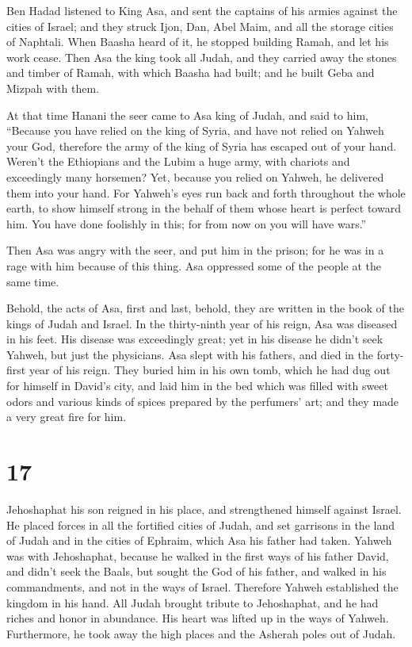  Ben Hadad listened to King Asa, and sent the captains of
his armies against the cities of Israel; and they struck Ijon, Dan, Abel
Maim, and all the storage cities of Naphtali.  When Baasha
heard of it, he stopped building Ramah, and let his work cease.
 Then Asa the king took all Judah, and they carried away
the stones and timber of Ramah, with which Baasha had built; and he
built Geba and Mizpah with them.

 At that time Hanani the seer came to Asa king of Judah,
and said to him, ``Because you have relied on the king of Syria, and
have not relied on Yahweh your God, therefore the army of the king of
Syria has escaped out of your hand.  Weren't the
Ethiopians and the Lubim a huge army, with chariots and exceedingly many
horsemen? Yet, because you relied on Yahweh, he delivered them into your
hand.  For Yahweh's eyes run back and forth throughout the
whole earth, to show himself strong in the behalf of them whose heart is
perfect toward him. You have done foolishly in this; for from now on you
will have wars.''

 Then Asa was angry with the seer, and put him in the
prison; for he was in a rage with him because of this thing. Asa
oppressed some of the people at the same time.

 Behold, the acts of Asa, first and last, behold, they
are written in the book of the kings of Judah and Israel.
 In the thirty-ninth year of his reign, Asa was diseased
in his feet. His disease was exceedingly great; yet in his disease he
didn't seek Yahweh, but just the physicians.  Asa slept
with his fathers, and died in the forty-first year of his reign.
 They buried him in his own tomb, which he had dug out
for himself in David's city, and laid him in the bed which was filled
with sweet odors and various kinds of spices prepared by the perfumers'
art; and they made a very great fire for him.

\hypertarget{section-16}{%
\section{17}\label{section-16}}

 Jehoshaphat his son reigned in his place, and
strengthened himself against Israel.  He placed forces in
all the fortified cities of Judah, and set garrisons in the land of
Judah and in the cities of Ephraim, which Asa his father had taken.
 Yahweh was with Jehoshaphat, because he walked in the
first ways of his father David, and didn't seek the Baals,
 but sought the God of his father, and walked in his
commandments, and not in the ways of Israel.  Therefore
Yahweh established the kingdom in his hand. All Judah brought tribute to
Jehoshaphat, and he had riches and honor in abundance. 
His heart was lifted up in the ways of Yahweh. Furthermore, he took away
the high places and the Asherah poles out of Judah.

